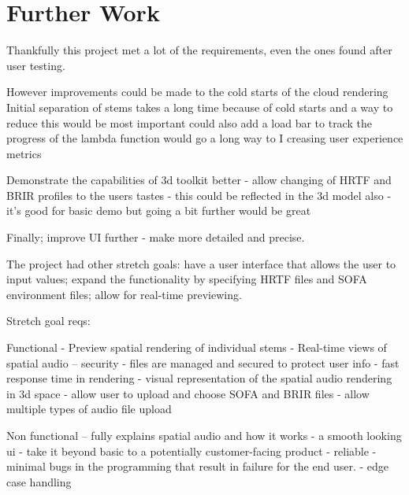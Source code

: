 \thispagestyle{plain}
\newpage
\section{Further Work}\label{sec:further-work}

\normalsize

Thankfully this project met a lot of the requirements, even the ones found after user testing.

However improvements could be made to the cold starts of the cloud rendering
Initial separation of stems takes a long time because of cold starts and a way to reduce this would be most important could also add a load bar to track the progress of the lambda function would go a long way to I creasing user experience metrics

Demonstrate the capabilities of 3d toolkit better - allow changing of HRTF and BRIR profiles to the users tastes - this could be reflected in the 3d model also - it's good for basic demo but going a bit further would be great

Finally; improve UI further - make more detailed and precise.

The project had other stretch goals: have a user interface that allows the user to input values; expand the functionality by specifying HRTF files and SOFA environment files; allow for real-time previewing.

Stretch goal reqs:

Functional
- Preview spatial rendering of individual stems
- Real-time views of spatial audio
-- security - files are managed and secured to protect user info
- fast response time in rendering
- visual representation of the spatial audio rendering in 3d space
- allow user to upload and choose SOFA and BRIR files
- allow multiple types of audio file upload

Non functional
-- fully explains spatial audio and how it works
- a smooth looking ui - take it beyond basic to a potentially customer-facing product
- reliable - minimal bugs in the programming that result in failure for the end user.
- edge case handling